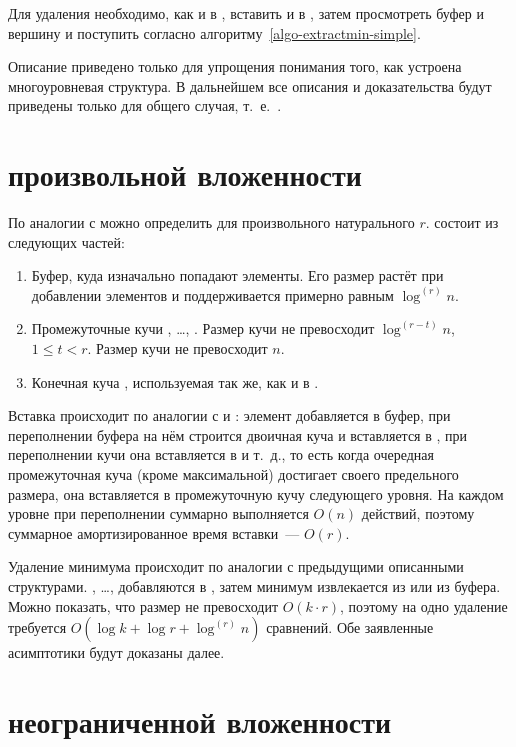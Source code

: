 Для удаления необходимо, как и в \SCH, вставить \MH[2] и \MH[1] в \HH,
затем просмотреть буфер и вершину \HH и поступить согласно
алгоритму~\ref{algo-extractmin-simple}.

Описание \CH[2] приведено только для упрощения понимания того, как
устроена многоуровневая структура. В дальнейшем все описания и доказательства
будут приведены только для общего случая, т.~е.~\CH[r].


\section{\CH произвольной вложенности}
По аналогии с \CH[2] можно определить \CH[r] для произвольного натурального $r$.  
\CH[r] состоит из следующих частей:

\begin{enumerate}
\item Буфер, куда изначально попадают элементы. Его размер растёт при добавлении
    элементов и поддерживается примерно равным $\log^{(r)} n$.
\item Промежуточные кучи \MH[1], \dots, \MH[r]. Размер кучи \MH[t] не превосходит
    $\log^{(r-t)} n$, $1 \leq t < r$. Размер кучи \MH[r] не превосходит $n$.
\item Конечная куча \HH, используемая так же, как и в \SCH.
\end{enumerate}

Вставка происходит по аналогии с \SCH и \CH[2]: элемент добавляется в буфер,
при переполнении буфера на нём строится двоичная куча и вставляется в \MH[1],
при переполнении кучи \MH[1] она вставляется в \MH[2] и т.~д., то есть
когда очередная промежуточная куча (кроме максимальной) достигает своего предельного
размера, она вставляется в промежуточную кучу следующего уровня.
На каждом уровне при переполнении суммарно выполняется $O(n)$ действий,
поэтому суммарное амортизированное время вставки~--- $O(r)$.

Удаление минимума происходит по аналогии с предыдущими описанными структурами.
\MH[1], \dots, \MH[r] добавляются в \HH, затем минимум извлекается из \HH
или из буфера. Можно показать, что размер \HH не превосходит
$O(k \cdot r)$, поэтому на одно удаление требуется $O(\log k + \log r + \log^{(r)} n)$
сравнений. Обе заявленные асимптотики будут доказаны далее.

\section{\CH неограниченной вложенности}

